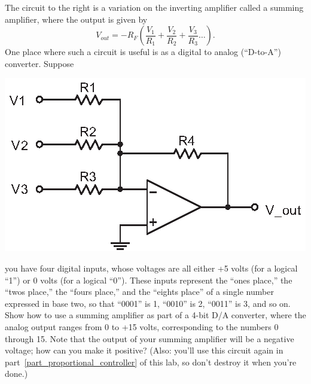 \begin{enumerate}[wide]
\begin{minipage}{.50\textwidth}
\item The circuit to the right is a variation on the inverting amplifier called a summing amplifier, where the output is given by 
\begin{equation*}
V_{out} = -R_F \left( \frac{V_1}{R_1} + \frac{V_2}{R_2} +\frac{V_3}{R_3} \dots \right).
\end{equation*}
One place where such a circuit is useful is as a digital to analog (``D-to-A'') converter.  Suppose 
\end{minipage}
\begin{minipage}{.49\textwidth}
\begin{flushright}
\includegraphics{op-amps/summing_amp.eps}
\vspace*{0.2in}
\end{flushright}
\end{minipage}
you have four digital inputs, whose voltages are all either +5 volts (for a logical ``1'') or 0 volts (for a logical ``0'').  These inputs represent the ``ones place,'' the ``twos place,'' the ``fours place,'' and the ``eights place'' of a single number expressed in base two, so that ``0001'' is 1, ``0010'' is 2, ``0011'' is 3, and so on.  Show how to use a summing amplifier as part of a 4-bit D/A converter, where the analog output ranges from 0 to +15 volts, corresponding to the numbers 0 through 15.  Note that the output of your summing amplifier will be a negative voltage; how can you make it positive?  (Also: you'll use this circuit again in part~\ref{part_proportional_controller} of this lab, so don't destroy it when you're done.) \label{part_summer}


\end{enumerate}
